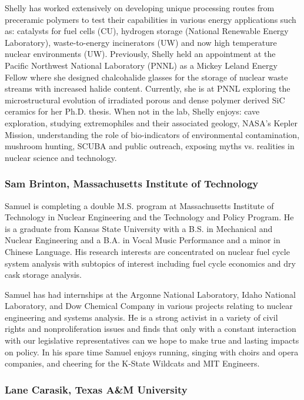 Shelly has worked extensively on developing unique processing routes from
preceramic polymers to test their capabilities in various energy applications
such as: catalysts for fuel cells (CU), hydrogen storage (National Renewable
Energy Laboratory), waste-to-energy incinerators (UW) and now high temperature
nuclear environments (UW). Previously, Shelly held an appointment at the Pacific
Northwest National Laboratory (PNNL) as a Mickey Leland Energy Fellow where she
designed chalcohalide glasses for the storage of nuclear waste streams with
increased halide content. Currently, she is at PNNL exploring the
microstructural evolution of irradiated porous and dense polymer derived SiC
ceramics for her Ph.D. thesis. When not in the lab, Shelly enjoys: cave
exploration, studying extremophiles and their associated geology, NASA's Kepler
Mission, understanding the role of bio-indicators of environmental
contamination, mushroom hunting, SCUBA and public outreach, exposing myths
vs. realities in nuclear science and technology.

\subsubsection*{Sam Brinton, Massachusetts Institute of Technology}

Samuel is completing a double M.S. program at Massachusetts Institute of
Technology in Nuclear Engineering and the Technology and Policy Program. He is a
graduate from Kansas State University with a B.S. in Mechanical and Nuclear
Engineering and a B.A. in Vocal Music Performance and a minor in Chinese
Language. His research interests are concentrated on nuclear fuel cycle system
analysis with subtopics of interest including fuel cycle economics and dry cask
storage analysis.

Samuel has had internships at the Argonne National Laboratory, Idaho National
Laboratory, and Dow Chemical Company in various projects relating to nuclear
engineering and systems analysis. He is a strong activist in a variety of civil
rights and nonproliferation issues and finds that only with a constant
interaction with our legislative representatives can we hope to make true and
lasting impacts on policy. In his spare time Samuel enjoys running, singing with
choirs and opera companies, and cheering for the K-State Wildcats and MIT
Engineers.

\subsubsection*{Lane Carasik, Texas A\&M University}

